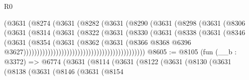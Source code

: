 \begin{lexlean}{R0}
\begin{coremodule}
                                          (@3631
                                            (@8274
                                              (@3631
                                                (@8282
                                                  (@3631
                                                    (@8290
                                                      (@3631
                                                        (@8298
                                                          (@3631
                                                            (@8306
                                                              (@3631
                                                                (@8314
                                                                  (@3631
                                                                    (@8322
                                                                      (@3631
                                                                        (@8330
                                                                          (@3631
                                                                            (@8338
                                                                              (@3631
                                                                                (@8346
                                                                                  (@3631
                                                                                    (@8354
                                                                                      (@3631
                                                                                        (@8362
                                                                                          (@3631
                                                                                            (@8366
                                                                                              @8368
                                                                                              @6396
                                                                                              @3627)))))))))))))))))))))))))))))))))))))))))))))
@8605 := @8105
    (fun (__b : @3372) =>
    @6774
      (@3631
        (@8114
          (@3631
            (@8122
              (@3631
                (@8130
                  (@3631
                    (@8138
                      (@3631
                        (@8146
                          (@3631
                            (@8154

\end{coremodule}
\end{lexlean}
